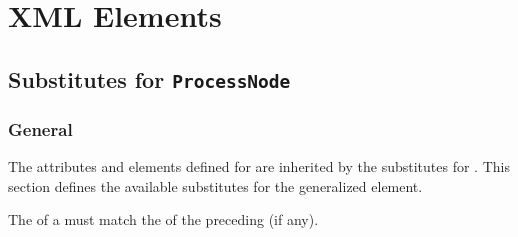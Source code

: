 \regularsectionformat

\chapter{XML Elements}
\label{sec:XMLelements}







\section{Substitutes for \texttt{ProcessNode}}

\subsection{General}
The attributes and elements defined for  are inherited by the substitutes for . This section defines the available substitutes for the generalized  element. 

The  of a  must match the  of the preceding  (if any).













